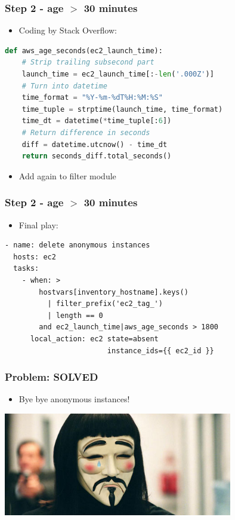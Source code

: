 \documentclass{beamer}
\begin{document}
\begin{frame}[fragile]\frametitle{Step 2 - age $>$ 30 minutes}

    \begin{itemize}
        \item Coding by Stack Overflow:
    \end{itemize}

    \begin{lstlisting}[language=Python]
def aws_age_seconds(ec2_launch_time):
    # Strip trailing subsecond part
    launch_time = ec2_launch_time[:-len('.000Z')]
    # Turn into datetime
    time_format = "%Y-%m-%dT%H:%M:%S"
    time_tuple = strptime(launch_time, time_format)
    time_dt = datetime(*time_tuple[:6])
    # Return difference in seconds
    diff = datetime.utcnow() - time_dt
    return seconds_diff.total_seconds()
    \end{lstlisting}

    \begin{itemize}
        \item Add again to filter module
    \end{itemize}

\end{frame}


\begin{frame}[fragile]\frametitle{Step 2 - age $>$ 30 minutes}

    \begin{itemize}
        \item Final play:
    \end{itemize}

    \begin{lstlisting}
- name: delete anonymous instances
  hosts: ec2
  tasks:
    - when: >
        hostvars[inventory_hostname].keys()
          | filter_prefix('ec2_tag_')
          | length == 0
        and ec2_launch_time|aws_age_seconds > 1800
      local_action: ec2 state=absent
                        instance_ids={{ ec2_id }}
    \end{lstlisting}

\end{frame}


\begin{frame}\frametitle{Problem: \textbf{SOLVED}}

    \begin{itemize}
        \item Bye bye anonymous instances!
    \end{itemize}

    \begin{center}
        \includegraphics[width=10cm]{sad-anonymous}
    \end{center}

\end{frame}
\end{document}
